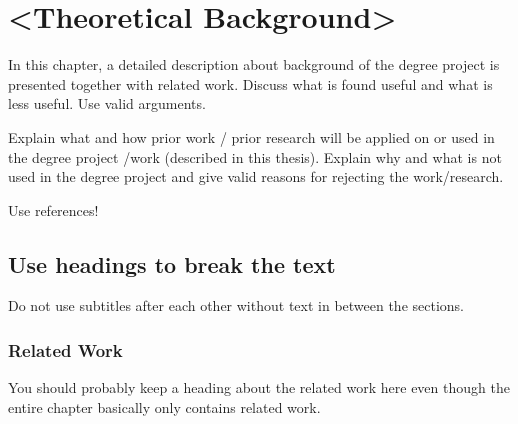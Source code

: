 \documentclass[/home/francois/latex/report/main.tex]{subfiles}
\begin{document}
\chapter{<Theoretical Background>}
In this chapter, a detailed description about background of the degree project is presented together with related work. Discuss what is found useful and what is less useful. Use valid arguments.

Explain what and how prior work / prior research will be applied on or used in the degree project /work (described in this thesis). Explain why and what is not used in the degree project and give valid reasons for rejecting the work/research.

Use references!

\section{Use headings to break the text}
Do not use subtitles after each other without text in between the sections.

\subsection{Related Work}
You should probably keep a heading about the related work here even though the entire chapter basically only contains related work.
\end{document}
